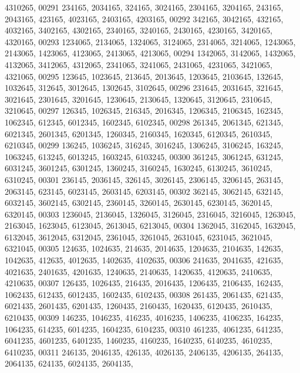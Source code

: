 \begin{DoxyCode}
      4310265,
00291        234165, 2034165,  324165, 3024165, 2304165, 3204165,  243165, 2043165,  423165, 4023165, 2403165, 
      4203165,
00292        342165, 3042165,  432165, 4032165, 3402165, 4302165, 2340165, 3240165, 2430165, 4230165, 3420165, 
      4320165,
00293       1234065, 2134065, 1324065, 3124065, 2314065, 3214065, 1243065, 2143065, 1423065, 4123065, 2413065, 
      4213065,
00294       1342065, 3142065, 1432065, 4132065, 3412065, 4312065, 2341065, 3241065, 2431065, 4231065, 3421065, 
      4321065,
00295        123645, 1023645,  213645, 2013645, 1203645, 2103645,  132645, 1032645,  312645, 3012645, 1302645, 
      3102645,
00296        231645, 2031645,  321645, 3021645, 2301645, 3201645, 1230645, 2130645, 1320645, 3120645, 2310645, 
      3210645,
00297        126345, 1026345,  216345, 2016345, 1206345, 2106345,  162345, 1062345,  612345, 6012345, 1602345, 
      6102345,
00298        261345, 2061345,  621345, 6021345, 2601345, 6201345, 1260345, 2160345, 1620345, 6120345, 2610345, 
      6210345,
00299        136245, 1036245,  316245, 3016245, 1306245, 3106245,  163245, 1063245,  613245, 6013245, 1603245, 
      6103245,
00300        361245, 3061245,  631245, 6031245, 3601245, 6301245, 1360245, 3160245, 1630245, 6130245, 3610245, 
      6310245,
00301        236145, 2036145,  326145, 3026145, 2306145, 3206145,  263145, 2063145,  623145, 6023145, 2603145, 
      6203145,
00302        362145, 3062145,  632145, 6032145, 3602145, 6302145, 2360145, 3260145, 2630145, 6230145, 3620145, 
      6320145,
00303       1236045, 2136045, 1326045, 3126045, 2316045, 3216045, 1263045, 2163045, 1623045, 6123045, 2613045, 
      6213045,
00304       1362045, 3162045, 1632045, 6132045, 3612045, 6312045, 2361045, 3261045, 2631045, 6231045, 3621045, 
      6321045,
00305        124635, 1024635,  214635, 2014635, 1204635, 2104635,  142635, 1042635,  412635, 4012635, 1402635, 
      4102635,
00306        241635, 2041635,  421635, 4021635, 2401635, 4201635, 1240635, 2140635, 1420635, 4120635, 2410635, 
      4210635,
00307        126435, 1026435,  216435, 2016435, 1206435, 2106435,  162435, 1062435,  612435, 6012435, 1602435, 
      6102435,
00308        261435, 2061435,  621435, 6021435, 2601435, 6201435, 1260435, 2160435, 1620435, 6120435, 2610435, 
      6210435,
00309        146235, 1046235,  416235, 4016235, 1406235, 4106235,  164235, 1064235,  614235, 6014235, 1604235, 
      6104235,
00310        461235, 4061235,  641235, 6041235, 4601235, 6401235, 1460235, 4160235, 1640235, 6140235, 4610235, 
      6410235,
00311        246135, 2046135,  426135, 4026135, 2406135, 4206135,  264135, 2064135,  624135, 6024135, 2604135, 

\end{DoxyCode}
